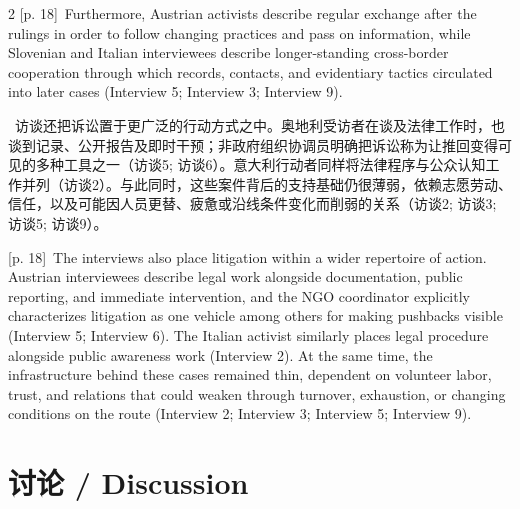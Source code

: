 \documentclass[10pt,a4paper]{article}
\begin{document}
\begin{paracol}{2}
\switchcolumn
{\scriptsize\color{gray} [p. 18]}\ Furthermore, Austrian activists describe regular exchange after the rulings in order to follow changing practices and pass on information, while Slovenian and Italian interviewees describe longer-standing cross-border cooperation through which records, contacts, and evidentiary tactics circulated into later cases (Interview 5; Interview 3; Interview 9).\par
\switchcolumn*
{\scriptsize\color{gray} [p. 18]}\ 访谈还把诉讼置于更广泛的行动方式之中。奥地利受访者在谈及法律工作时，也谈到记录、公开报告及即时干预；非政府组织协调员明确把诉讼称为让推回变得可见的多种工具之一（访谈5; 访谈6）。意大利行动者同样将法律程序与公众认知工作并列（访谈2）。与此同时，这些案件背后的支持基础仍很薄弱，依赖志愿劳动、信任，以及可能因人员更替、疲惫或沿线条件变化而削弱的关系（访谈2; 访谈3; 访谈5; 访谈9）。\par
\switchcolumn
{\scriptsize\color{gray} [p. 18]}\ The interviews also place litigation within a wider repertoire of action. Austrian interviewees describe legal work alongside documentation, public reporting, and immediate intervention, and the NGO coordinator explicitly characterizes litigation as one vehicle among others for making pushbacks visible (Interview 5; Interview 6). The Italian activist similarly places legal procedure alongside public awareness work (Interview 2). At the same time, the infrastructure behind these cases remained thin, dependent on volunteer labor, trust, and relations that could weaken through turnover, exhaustion, or changing conditions on the route (Interview 2; Interview 3; Interview 5; Interview 9).\par
\switchcolumn*
\end{paracol}
\section*{讨论 / Discussion}
\end{document}
